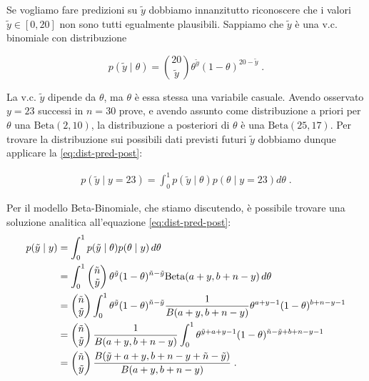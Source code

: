 \documentclass[
]{memoir}
\theoremstyle{definition}
\theoremstyle{definition}
\theoremstyle{definition}
\theoremstyle{definition}
\theoremstyle{remark}
\begin{document}
Se vogliamo fare predizioni su \(\tilde{y}\) dobbiamo innanzitutto riconoscere che i valori \(\tilde{y} \in [0, 20]\) non sono tutti egualmente plausibili. Sappiamo che \(\tilde{y}\) è una v.c. binomiale con distribuzione

\begin{equation}
p(\tilde{y}\mid \theta) = \binom{20}{\tilde{y}} \theta^{\tilde{y}}(1-\theta)^{20 - \tilde{y}} \; .
\label{eq:post-yprime}
\end{equation}

\noindent
La v.c. \(\tilde{y}\) dipende da \(\theta\), ma \(\theta\) è essa stessa una variabile casuale. Avendo osservato \(y = 23\) successi in \(n = 30\) prove, e avendo assunto come distribuzione a priori per \(\theta\) una \(\mbox{Beta}(2, 10)\), la distribuzione a posteriori di \(\theta\) è una \(\mbox{Beta}(25, 17)\). Per trovare la distribuzione sui possibili dati previsti futuri \(\tilde{y}\) dobbiamo dunque applicare la \eqref{eq:dist-pred-post}:

\begin{align}
p(\tilde{y} \mid y = 23) = \int_0^1 p(\tilde{y} \mid \theta) p(\theta \mid y = 23) d\theta \; .
\label{eq:post-yprime-y17}
\end{align}

Per il modello Beta-Binomiale, che stiamo discutendo, è possibile trovare una soluzione analitica all'equazione \eqref{eq:dist-pred-post}:
\begin{align}
p(\tilde{y} \mid y) &= \int_0^1 p(\tilde{y} \mid \theta)
p(\theta \mid y)\, d\theta \notag\\
 &= \int_0^1 \begin{pmatrix}\tilde{n}\\\tilde{y}\end{pmatrix}
 \theta^{\tilde{y}}
(1-\theta)^{\tilde{n}-\tilde{y}} \mbox{Beta}(a+y,b+n-y) \, d\theta \notag\\
&= \begin{pmatrix}{\tilde{n}}\\\tilde{y}\end{pmatrix} \int_0^1 \theta^{\tilde{y}}
(1-\theta)^{\tilde{n}-\tilde{y}} \frac{1}{B(a+y, b+n-y)}\theta^{a+y-1}(1-\theta)^{b+n-y-1}\notag\\
&= \begin{pmatrix}{\tilde{n}}\\\tilde{y}\end{pmatrix} \frac{1}{B(a+y, b+n-y)}\int_0^1 \theta^{\tilde{y}+a+y-1}(1-\theta)^{\tilde{n}-\tilde{y}+b+n-y-1}\notag\\
&= \begin{pmatrix}{\tilde{n}}\\\tilde{y}\end{pmatrix} \frac{B(\tilde{y}+a+y,b+n-y+\tilde{n}-\tilde{y})}{B(a+y, b+n-y)} \; .
\label{eq:post-yprime-an-sol-betabin}
\end{align}
\end{document}

